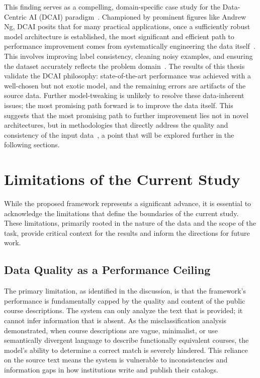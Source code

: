 This finding serves as a compelling, domain-specific case study for the Data-Centric AI (DCAI) paradigm~\cite{zha2023datacentricartificialintelligencesurvey,wang2025datacentricaicomprehensivesurvey}. Championed by prominent figures like Andrew Ng, DCAI posits that for many practical applications, once a sufficiently robust model architecture is established, the most significant and efficient path to performance improvement comes from systematically engineering the data itself~\cite{ngdatacentric_2021,Strickland_2023}. This involves improving label consistency, cleaning noisy examples, and ensuring the dataset accurately reflects the problem domain~\cite{zha2023datacentricartificialintelligencesurvey,ying2025surveydatacentricaitabular}. The results of this thesis validate the DCAI philosophy: state-of-the-art performance was achieved with a well-chosen but not exotic model, and the remaining errors are artifacts of the source data. Further model-tweaking is unlikely to resolve these data-inherent issues; the most promising path forward is to improve the data itself. This suggests that the most promising path to further improvement lies not in novel architectures, but in methodologies that directly address the quality and consistency of the input data~\cite{gauthier2022}, a point that will be explored further in the following sections.

\section{Limitations of the Current Study}\label{ch:5.2}
While the proposed framework represents a significant advance, it is essential to acknowledge the limitations that define the boundaries of the current study. These limitations, primarily rooted in the nature of the data and the scope of the task, provide critical context for the results and inform the directions for future work.

\subsection{Data Quality as a Performance Ceiling}\label{ch:5.2.1}
The primary limitation, as identified in the discussion, is that the framework's performance is fundamentally capped by the quality and content of the public course descriptions. The system can only analyze the text that is provided; it cannot infer information that is absent. As the misclassification analysis demonstrated, when course descriptions are vague, minimalist, or use semantically divergent language to describe functionally equivalent courses, the model's ability to determine a correct match is severely hindered. This reliance on the source text means the system is vulnerable to inconsistencies and information gaps in how institutions write and publish their catalogs.

